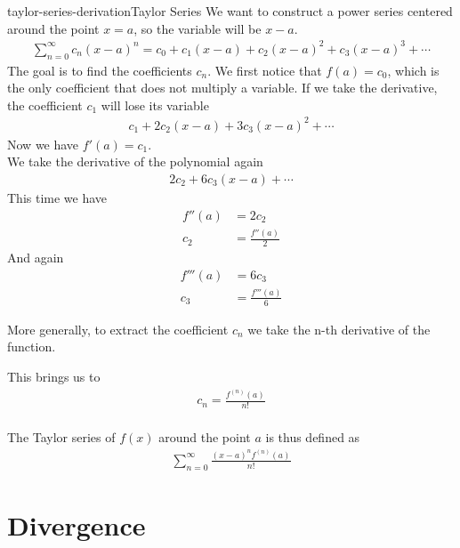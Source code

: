 \documentclass[preview]{standalone}
\begin{document}
\begin{snippetproof}{taylor-series-derivation}{Taylor Series}
    We want to construct a power series centered around the point \(x=a\),
    so the variable will be \(x-a\).
    \begin{align*}
        \sum_{n=0}^{\infty}c_n{(x-a)}^n
        =c_0+c_1(x-a)+c_2{(x-a)}^2+c_3{(x-a)}^3+\cdots
    \end{align*}
    The goal is to find the coefficients \(c_n\).
    We first notice that \(f(a)=c_0\), which is the only coefficient that does not multiply a variable.
    If we take the derivative, the coefficient \(c_1\) will lose its variable
    \begin{align*}
        c_1+2c_2(x-a)+3c_3{(x-a)}^2+\cdots
    \end{align*}
    Now we have \(f'(a)=c_1\).
    \\
    We take the derivative of the polynomial again
    \begin{align*}
        2c_2+6c_3(x-a)+\cdots
    \end{align*}
    This time we have
    \begin{align*}
        f''(a)&=2c_2\\
        c_2&=\frac{f''(a)}{2}
    \end{align*}
    And again
    \begin{align*}
        f'''(a)&=6c_3\\
        c_3&=\frac{f'''(a)}{6}
    \end{align*}

    More generally, to extract the coefficient \(c_n\) we take the n-th derivative of the function.

    This brings us to
    \begin{align*}
        c_n=\frac{f^{(n)}(a)}{n!}
    \end{align*}
    \\
    The Taylor series of \(f(x)\) around the point \(a\) is thus defined as
    \begin{align*}
        \sum_{n=0}^{\infty}\frac{{(x-a)}^n f^{(n)}(a)}{n!}
    \end{align*}
\end{snippetproof}

\section{Divergence}
\end{document}

